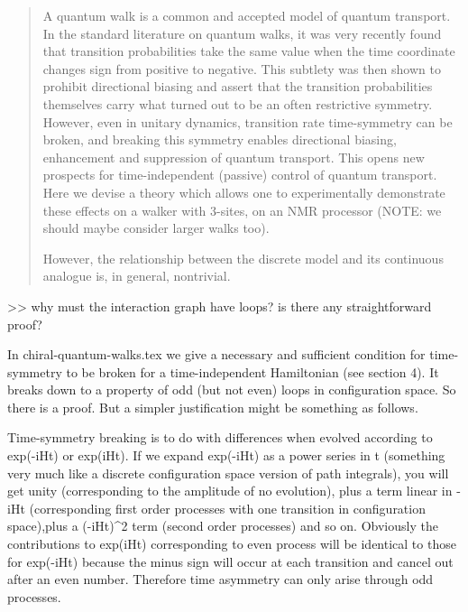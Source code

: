 \documentclass[aps,pra,12pt,nofootinbib,superscriptaddress,longbibliography,showpacs]{revtex4-1}
\theoremstyle{plain}
\theoremstyle{definition}
\begin{document}
\author{Seth Lloyd}



\begin{abstract}
A quantum walk is a common and accepted model of quantum transport.  
In the standard literature on quantum walks, it was very recently
found that transition probabilities take the same value when the time
coordinate changes sign from positive to negative.  This subtlety was
then shown to prohibit directional biasing and assert that the
transition probabilities themselves carry what turned out to be an often
restrictive symmetry.  However, even in unitary dynamics, transition
rate time-symmetry can be broken, and breaking this symmetry enables directional
biasing, enhancement and suppression of quantum transport.  This opens new
prospects for time-independent (passive) control of quantum transport. 
Here we devise a theory which allows one to experimentally demonstrate these
effects on a walker with 3-sites, on an NMR processor (NOTE: we should maybe
consider larger walks too).  

However, the relationship between the discrete model and its
continuous analogue is, in general, nontrivial.
\end{abstract} 


\maketitle



>> why must the interaction graph have loops? is there any straightforward proof?

In chiral-quantum-walks.tex we give a necessary and sufficient condition for time-symmetry to be broken for a time-independent Hamiltonian (see section 4). It breaks down to a property of odd (but not even) loops in configuration space. So there is a proof. But a simpler justification might be something as follows. 

Time-symmetry breaking is to do with differences when evolved according to exp(-iHt) or exp(iHt). If we expand exp(-iHt) as a power series in t (something very much like a discrete configuration space version of path integrals), you will get unity (corresponding to the amplitude of no evolution), plus a term linear in -iHt (corresponding first order processes with one transition in configuration space),plus a (-iHt)^2 term (second order processes) and so on. Obviously the contributions to exp(iHt) corresponding to even process will be identical to those for exp(-iHt) because the minus sign will occur at each transition and cancel out after an even number. Therefore time asymmetry can only arise through odd processes. 
\end{document}
